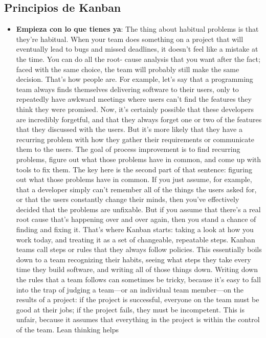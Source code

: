 \subsection{Principios de Kanban}
\begin{itemize}
    \item \textbf{Empieza con lo que tienes ya}: %
    The thing about habitual problems is that they're habitual.
When your team does something on a project that will eventually lead to bugs and
missed deadlines, it doesn't feel like a mistake at the time. You can do all the root-
cause analysis that you want after the fact; faced with the same choice, the team will
probably still make the same decision. That's how people are.
For example, let's say that a programming team always finds themselves delivering
software to their users, only to repeatedly have awkward meetings where users can't
find the features they think they were promised. Now, it's certainly possible that these
developers are incredibly forgetful, and that they always forget one or two of
the features that they discussed with the users. But it's more likely that they
have a recurring
problem with how they gather their requirements or communicate them to the users.
The goal of process improvement is to find recurring problems, figure out what those
problems have in common, and come up with tools to fix them.
The key here is the second part of that sentence: figuring out what those problems
have in common. If you just assume, for example, that a developer simply can't
remember all of the things the users asked for, or that the users constantly change
their minds, then you've effectively decided that the problems are unfixable. But if
you assume that there's a real root cause that's happening over and over again, then
you stand a chance of finding and fixing it.
That's where Kanban starts: taking a look at how you work today, and treating it as a
set of changeable, repeatable steps. Kanban teams call steps or rules that they always
follow policies. This essentially boils down to a team recognizing their habits, seeing
what steps they take every time they build software, and writing all of those things
down.
Writing down the rules that a team follows can sometimes be tricky, because it's easy
to fall into the trap of judging a team—or an individual team member—on the results
of a project: if the project is successful, everyone on the team must be good at their
jobs; if the project fails, they must be incompetent. This is unfair, because it assumes
that everything in the project is within the control of the team. Lean thinking helps

\end{itemize}
